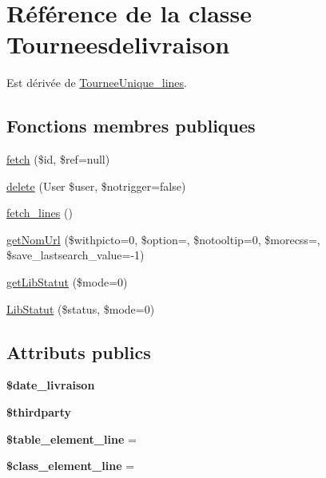 \hypertarget{classTourneesdelivraison}{}\section{Référence de la classe Tourneesdelivraison}
\label{classTourneesdelivraison}


Est dérivée de \hyperlink{classTourneeUnique__lines}{Tournee\+Unique\+\_\+lines}.

\subsection*{Fonctions membres publiques}
\begin{DoxyCompactItemize}
\item 
\hyperlink{classTourneesdelivraison_a3809e7e70ed23aa020e5a0d3a250f2fa}{fetch} (\$id, \$ref=null)
\item 
\hyperlink{classTourneesdelivraison_ac82b8478866e488f5b9eb0f745f3afbe}{delete} (User \$user, \$notrigger=false)
\item 
\hyperlink{classTourneesdelivraison_a3bf76262721043db00d1f4ebc1375436}{fetch\+\_\+lines} ()
\item 
\hyperlink{classTourneesdelivraison_a69ecf121daa602cf4536d40480f49fa8}{get\+Nom\+Url} (\$withpicto=0, \$option=\textquotesingle{}\textquotesingle{}, \$notooltip=0, \$morecss=\textquotesingle{}\textquotesingle{}, \$save\+\_\+lastsearch\+\_\+value=-\/1)
\item 
\hyperlink{classTourneesdelivraison_a84f62d04a939395511ff0fd82ab8ac5e}{get\+Lib\+Statut} (\$mode=0)
\item 
\hyperlink{classTourneesdelivraison_ad6f98e136ee508d0ff4fd798692eb9e6}{Lib\+Statut} (\$status, \$mode=0)
\end{DoxyCompactItemize}
\subsection*{Attributs publics}
\begin{DoxyCompactItemize}
\item 
\mbox{\label{classTourneesdelivraison_a2b871dbc02ce8d400ec035608c5b894d}} 
{\bfseries \$date\+\_\+livraison}
\item 
\mbox{\label{classTourneesdelivraison_a36cec7d903fd200f09eb86a71ca6aee8}} 
{\bfseries \$thirdparty}
\item 
\mbox{\label{classTourneesdelivraison_a5122d51500319a3d675fbfe2eda7fd6a}} 
{\bfseries \$table\+\_\+element\+\_\+line} = \textquotesingle{}\textquotesingle{}
\item 
\mbox{\label{classTourneesdelivraison_a8c5ebffd47e3a95a935bdea9371ce6db}} 
{\bfseries \$class\+\_\+element\+\_\+line} = \textquotesingle{}\textquotesingle{}
\end{DoxyCompactItemize}


